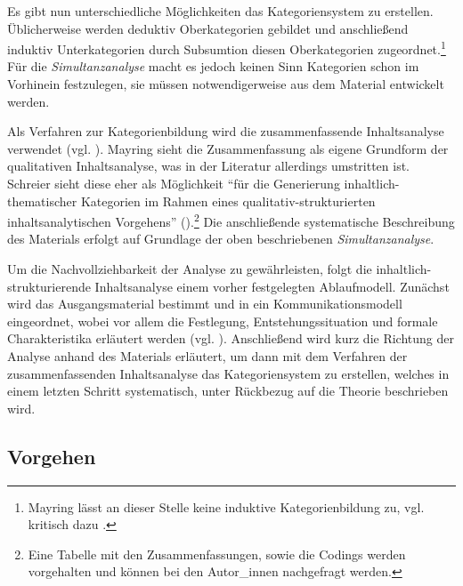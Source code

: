 \documentclass[12pt, titlepage=true, toc=bib]{scrartcl}
\begin{document}
\noindent Es gibt nun unterschiedliche Möglichkeiten das Kategoriensystem zu erstellen. Üblicherweise werden deduktiv Oberkategorien gebildet und anschließend induktiv Unterkategorien durch Subsumtion diesen Oberkategorien zugeordnet.\footnote{Mayring lässt an dieser Stelle keine induktive Kategorienbildung zu, vgl. kritisch dazu \textcite[Kap. II.4]{steigleder_strukturierende_2008}.} Für die \textit{Simultanzanalyse} macht es jedoch keinen Sinn Kategorien schon im Vorhinein festzulegen, sie müssen notwendigerweise aus dem Material entwickelt werden. 

Als Verfahren zur Kategorienbildung wird die zusammenfassende Inhaltsanalyse verwendet (vgl. \cite[Kap. 5.5.2]{mayring_qualitative_2010}). Mayring sieht die Zusammenfassung als eigene Grundform der qualitativen Inhaltsanalyse, was in der Literatur allerdings umstritten ist. Schreier sieht diese eher als Möglichkeit "`für die Generierung inhaltlich-thematischer Kategorien im Rahmen eines qualitativ-strukturierten inhaltsanalytischen Vorgehens"' (\cite[14]{schreier_varianten_2014}).\footnote{Eine Tabelle mit den Zusammenfassungen, sowie die Codings werden vorgehalten und können bei den Autor\_innen nachgefragt werden.} Die anschließende systematische Beschreibung des Materials erfolgt auf Grundlage der oben beschriebenen \textit{Simultanzanalyse}.

Um die Nachvollziehbarkeit der Analyse zu gewährleisten, folgt die inhaltlich-strukturierende Inhaltsanalyse einem vorher festgelegten Ablaufmodell. Zunächst wird das Ausgangsmaterial bestimmt und in ein Kommunikationsmodell eingeordnet, wobei vor allem die Festlegung, Entstehungssituation und formale Charakteristika erläutert werden (vgl. \cite[52-53]{mayring_qualitative_2010}). Anschließend wird kurz die Richtung der Analyse anhand des Materials erläutert, um dann mit dem Verfahren der zusammenfassenden Inhaltsanalyse das Kategoriensystem zu erstellen, welches in einem letzten Schritt systematisch, unter Rückbezug auf die Theorie beschrieben wird.

\subsection{Vorgehen}
\end{document}
